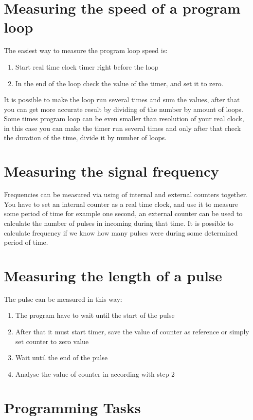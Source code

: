 \documentclass[english]{article}
\begin{document}
\section{Measuring the speed of a program loop}
The easiest way to measure the program loop speed is:
\begin{enumerate}
\item Start real time clock timer right before the loop
\item In the end of the loop check the value of the timer, and set it to zero.
\end{enumerate}
It is possible to make the loop run several times and sum the values, after that you can get more accurate result by dividing of the number by amount of loops. Some times program loop can be even smaller than resolution of your real clock, in this case you can make the timer run several times and only after that check the duration of the time, divide it by number of loops.
\section{Measuring the signal frequency}
Frequencies can be measured via using of internal and external counters together. You have to set an internal counter as a real time clock, and use it to measure some period of time for example one second, an external counter can be used to calculate the number of pulses in incoming during that time. It is possible to calculate frequency if we know how many pulses were during some determined period of time.
\section{Measuring the length of a pulse}
The pulse can be measured in this way:
\begin{enumerate}
\item The program have to wait until the start of the pulse
\item After that it must start timer, save the value of counter as reference or simply set counter to zero value
\item Wait until the end of the pulse
\item Analyse the value of counter in according with step 2
\end{enumerate}
\section{Programming Tasks}
\end{document}
